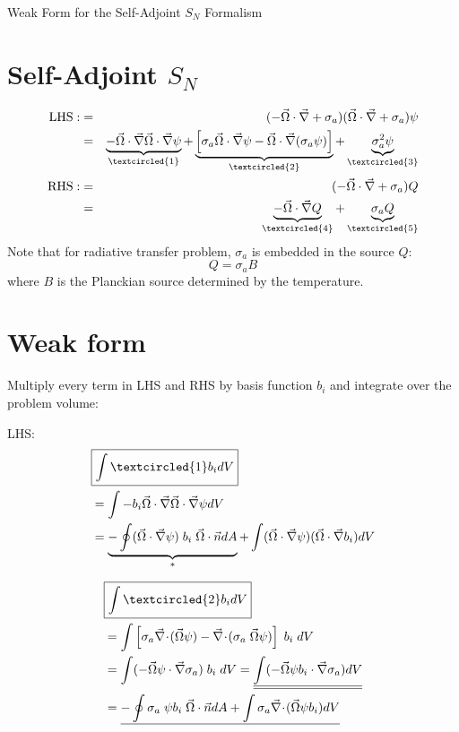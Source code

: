 \documentclass{article}
\renewcommand{\div}{\vec{\nabla}\! \cdot \!}
\newcommand{\grad}{\vec{\nabla}}
\newcommand{\bea}{\begin{eqnarray}}
\newcommand{\eea}{\end{eqnarray}}
\newcommand{\be}{\begin{equation}}
\newcommand{\ee}{\end{equation}}
\newcommand{\vo}{\vec{\Omega}}
\newcommand{\vn}{\vec{n}}
\begin{document}


\begin{center}
{\Huge Weak Form for the Self-Adjoint $S_N$ Formalism}
\end{center}

\section{Self-Adjoint $S_N$}
\bea
\text{LHS}: &=& (-\vo\cdot\grad + \sigma_a)(\vo\cdot\grad + \sigma_a)\psi \\
            &=& \underbrace{-\vo\cdot\grad\vo\cdot\grad\psi}_{\textcircled{1}} + \underbrace{\left[\sigma_a\vo\cdot\grad\psi - \vo\cdot\grad(\sigma_a\psi)\right]}_{\textcircled{2}} + \underbrace{\sigma_a^2\psi}_{\textcircled{3}} \\
\text{RHS}: &=& (-\vo\cdot\grad + \sigma_a)Q \\
            &=& \underbrace{-\vo\cdot\grad Q}_{\textcircled{4}} + \underbrace{\sigma_a Q}_{\textcircled{5}}
\eea
Note that for radiative transfer problem, $\sigma_a$ is embedded in the source $Q$:
\be
Q = \sigma_a B
\ee
where $B$ is the Planckian source determined by the temperature.


\section{Weak form}
Multiply every term in LHS and RHS by basis function $b_i$ and integrate over the problem volume:

LHS:
\begin{align}
 & \boxed{\int\textcircled{1}b_i dV} \nonumber\\
 &= \int -b_i\vo\cdot\grad\vo\cdot\grad\psi dV \\
 &= \underbrace{- \oint(\vo\cdot\grad\psi)\;b_i\;\vo\cdot\vn dA}_{*} + \int (\vo\cdot\grad\psi)(\vo\cdot\grad b_i) dV
\end{align}

\begin{align}
 & \boxed{\int\textcircled{2}b_i dV} \nonumber\\
 &= \int\left[\sigma_a\div(\vo\psi) - \div(\sigma_a\;\vo\psi)\right]\;b_i\;dV \\
 &= \int(-\vo\psi\cdot\grad\sigma_a)\;b_i\;dV = \underline{\underline{\int(-\vo\psi b_i\cdot\grad\sigma_a)dV}} \label{eq:pwl_lhs} \\
 &= \underline{-\oint \sigma_a\;\psi b_i\;\vo\cdot\vn dA + \int\sigma_a\div(\vo\psi b_i) dV} \label{eq:pwc_lhs}
\end{align}
\end{document}
